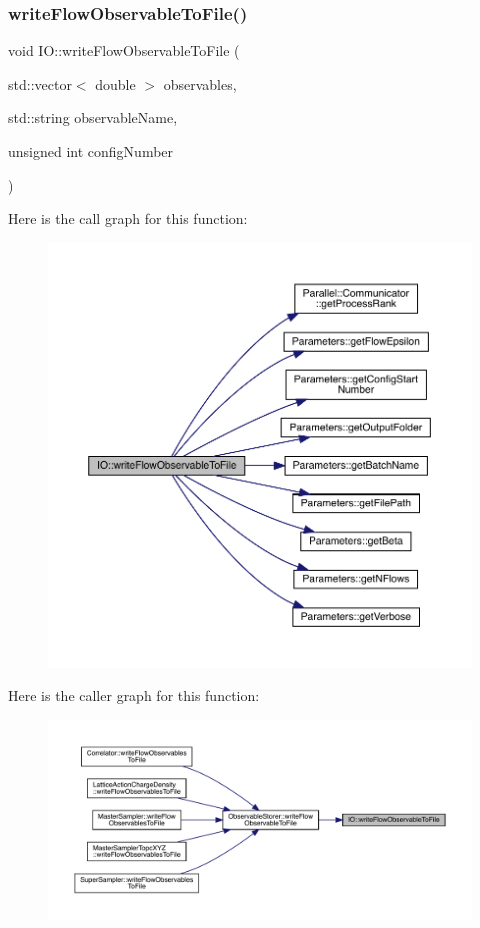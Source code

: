 \subsubsection{\texorpdfstring{writeFlowObservableToFile()}{writeFlowObservableToFile()}}
{\footnotesize\ttfamily void I\+O\+::write\+Flow\+Observable\+To\+File (\begin{DoxyParamCaption}\item[{std\+::vector$<$ double $>$}]{observables,  }\item[{std\+::string}]{observable\+Name,  }\item[{unsigned int}]{config\+Number }\end{DoxyParamCaption})}

Here is the call graph for this function\+:\nopagebreak
\begin{figure}[H]
\begin{center}
\leavevmode
\includegraphics[width=350pt]{namespace_i_o_a4f554804fd2ccd9c13c73777c5cbbf77_cgraph}
\end{center}
\end{figure}
Here is the caller graph for this function\+:\nopagebreak
\begin{figure}[H]
\begin{center}
\leavevmode
\includegraphics[width=350pt]{namespace_i_o_a4f554804fd2ccd9c13c73777c5cbbf77_icgraph}
\end{center}
\end{figure}
